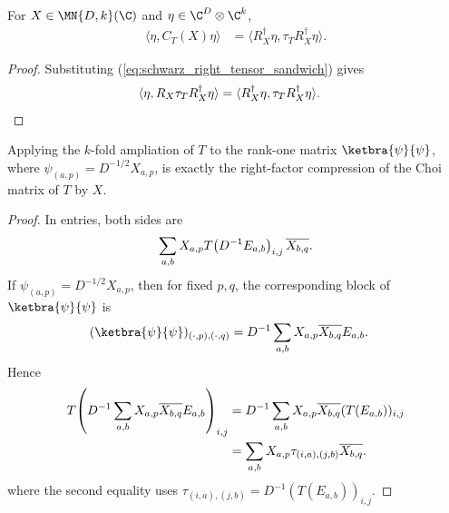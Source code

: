\begin{theorem}
    \label{thm:choi_right_compression_quadratic_form}
    \leanok
    For $X\in\MN{D,k}(\C)$ and $\eta\in\C^D\otimes\C^k$,
    \begin{align}
        \langle\eta,C_T(X)\eta\rangle
         & =\langle R_X^\dagger\eta,\tau_T R_X^\dagger\eta\rangle.
        \label{eq:schwarz_right_compression_quadratic}
    \end{align}
\end{theorem}

\begin{proof}
    \leanok
    Substituting (\ref{eq:schwarz_right_tensor_sandwich}) gives
    \begin{align}
        \langle\eta,R_X\tau_T R_X^\dagger\eta\rangle
         & =\langle R_X^\dagger\eta,\tau_T R_X^\dagger\eta\rangle.
        \notag
    \end{align}
\end{proof}

\begin{lemma}
    \label{lem:rank_one_ampliation_choi_compression}
    \leanok
    Applying the $k$-fold ampliation of $T$ to the rank-one matrix
    $\ketbra{\psi}{\psi}$, where
    $\psi_{(a,p)}=D^{-1/2}X_{a,p}$, is exactly the right-factor compression
    of the Choi matrix of $T$ by $X$.
\end{lemma}

\begin{proof}
    \leanok
    In entries, both sides are
    \begin{align}
        \sum_{a,b}X_{a,p}
        T\!\left(D^{-1}E_{a,b}\right)_{i,j}
        \overline{X_{b,q}}.
        \notag
    \end{align}
    If $\psi_{(a,p)}=D^{-1/2}X_{a,p}$, then for fixed $p,q$, the corresponding
    block of $\ketbra{\psi}{\psi}$ is
    \begin{align}
        (\ketbra{\psi}{\psi})_{(\cdot,p),(\cdot,q)}
         & =D^{-1}\sum_{a,b}X_{a,p}\overline{X_{b,q}}E_{a,b}.
        \notag
    \end{align}
    Hence
    \begin{align}
        T\!\left(D^{-1}\sum_{a,b}
           X_{a,p}\overline{X_{b,q}}E_{a,b}\right)_{i,j}
         & =D^{-1}\sum_{a,b}X_{a,p}\overline{X_{b,q}}
                                   (T(E_{a,b}))_{i,j} \notag \\
         & =\sum_{a,b}X_{a,p}\tau_{(i,a),(j,b)}
        \overline{X_{b,q}}.
        \notag
    \end{align}
    where the second equality uses
    $\tau_{(i,a),(j,b)}=D^{-1}(T(E_{a,b}))_{i,j}$.
\end{proof}

